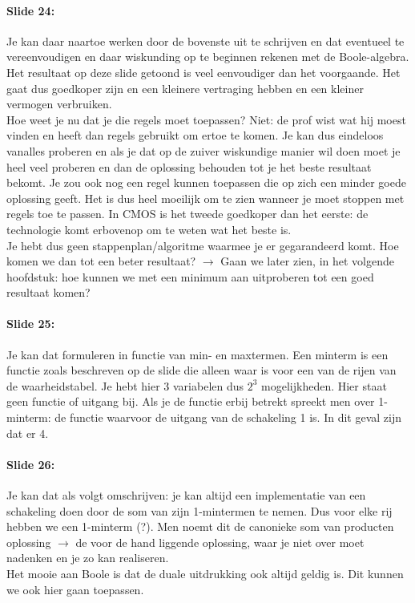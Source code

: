 \documentclass[10pt,a4paper]{book}
\begin{document}
\paragraph{Slide 24:} Je kan daar naartoe werken door de bovenste uit te schrijven en dat eventueel te vereenvoudigen en daar wiskunding op te beginnen rekenen met de Boole-algebra. Het resultaat op deze slide getoond is veel eenvoudiger dan het voorgaande. Het gaat dus goedkoper zijn en een kleinere vertraging hebben en een kleiner vermogen verbruiken.\\
Hoe weet je nu dat je die regels moet toepassen? Niet: de prof wist wat hij moest vinden en heeft dan regels gebruikt om ertoe te komen. Je kan dus eindeloos vanalles proberen en als je dat op de zuiver wiskundige manier wil doen moet je heel veel proberen en dan de oplossing behouden tot je het beste resultaat bekomt. Je zou ook nog een regel kunnen toepassen die op zich een minder goede oplossing geeft. Het is dus heel moeilijk om te zien wanneer je moet stoppen met regels toe te passen. In CMOS is het tweede goedkoper dan het eerste: de technologie komt erbovenop om te weten wat het beste is.\\
Je hebt dus geen stappenplan/algoritme waarmee je er gegarandeerd komt. Hoe komen we dan tot een beter resultaat? $\rightarrow$ Gaan we later zien, in het volgende hoofdstuk: hoe kunnen we met een minimum aan uitproberen tot een goed resultaat komen?

\paragraph{Slide 25:} Je kan dat formuleren in functie van min- en maxtermen. Een minterm is een functie zoals beschreven op de slide die alleen waar is voor een van de rijen van de waarheidstabel. Je hebt hier 3 variabelen dus $2^3$ mogelijkheden. Hier staat geen functie of uitgang bij. Als je de functie erbij betrekt spreekt men over 1-minterm: de functie waarvoor de uitgang van de schakeling 1 is. In dit geval zijn dat er 4. 

\paragraph{Slide 26:} Je kan dat als volgt omschrijven: je kan altijd een implementatie van een schakeling doen door de som van zijn 1-mintermen te nemen. Dus voor elke rij hebben we een 1-minterm (?). Men noemt dit de canonieke som van producten oplossing $\rightarrow$ de voor de hand liggende oplossing, waar je niet over moet nadenken en je zo kan realiseren.\\
Het mooie aan Boole is dat de duale uitdrukking ook altijd geldig is. Dit kunnen we ook hier gaan toepassen.
\end{document}
